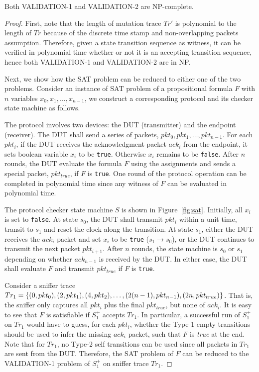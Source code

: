 \begin{lemma}
  Both VALIDATION-1 and VALIDATION-2 are NP-complete.
\end{lemma}
\begin{proof}
  First, note that the length of mutation trace $Tr'$ is polynomial to the
  length of $Tr$ because of the discrete time stamp and non-overlapping packets
  assumption.
  Therefore, given a state transition sequence as witness, it can be verified in
  polynomial time whether or not it is an accepting transition sequence, hence
  both VALIDATION-1 and VALIDATION-2 are in NP.

  Next, we show how the SAT problem can be reduced to either one of the two
  problems.
  Consider an instance of SAT problem of a propositional formula $F$ with $n$
  variables $x_0,x_1,\ldots, x_{n-1}$, we construct a corresponding protocol and
  its checker state machine as follows.

  The protocol involves two devices: the DUT (transmitter) and the endpoint
  (receiver).
  The DUT shall send a series of packets, $pkt_0, pkt_1,\ldots, pkt_{n-1}$.
  For each $pkt_i$, if the DUT receives the
  acknowledgment packet $ack_i$ from the endpoint, it sets boolean variable
  $x_i$ to be \texttt{true}.
  Otherwise $x_i$ remains to be \texttt{false}.
  After $n$ rounds, the DUT evaluate the formula $F$ using the assignments and
  sends a special packet, $pkt_{true}$, if $F$ is \texttt{true}.
  One round of the protocol operation can be completed in polynomial time since
  any witness of $F$ can be evaluated in polynomial time.

  The protocol checker state machine $S$ is shown in Figure~\ref{fig:sat}.
  Initially, all $x_i$ is set to \texttt{false}.
  At state $s_0$, the DUT shall transmit $pkt_i$ within a unit time, transit to
  $s_1$ and reset the clock along the transition.
  At state $s_1$, either the DUT receives the $ack_i$ packet and
  set $x_i$ to be \texttt{true} ($s_1 \rightarrow s_0$), or the DUT continues to
  transmit the next packet $pkt_{i+1}$.
  After $n$ rounds, the state machine is $s_0$ or $s_1$ depending on whether
  $ack_{n-1}$ is received by the DUT.
  In either case, the DUT shall evaluate $F$ and transmit $pkt_{true}$ if $F$ is
  \texttt{true}.  

  Consider a sniffer trace $Tr_1=\{(0, pkt_0), (2, pkt_1),\\ (4,
  pkt_2),\ldots, (2(n-1), pkt_{n-1}), (2n, pkt_{true})\}$.
  That is, the sniffer only captures all $pkt_i$ plus the final $pkt_{true}$, but none of
  $ack_i$.
  It is easy to see that $F$ is satisfiable if $S_1^+$ accepts
  $Tr_1$.
  In particular, a successful run of $S_1^+$ on $Tr_1$ would have to
  guess, for each $pkt_i$, whether the Type-1 empty transitions should be used
  to infer the missing $ack_i$ packet, such that $F$ is \textit{true} at the
  end.
  Note that for $Tr_1$, no Type-2 self transitions can be used since all
  packets in $Tr_1$ are sent from the DUT.
  Therefore, the SAT problem of $F$ can be reduced to the VALIDATION-1 problem
  of $S^+_1$ on sniffer trace $Tr_1$.


\end{proof}
